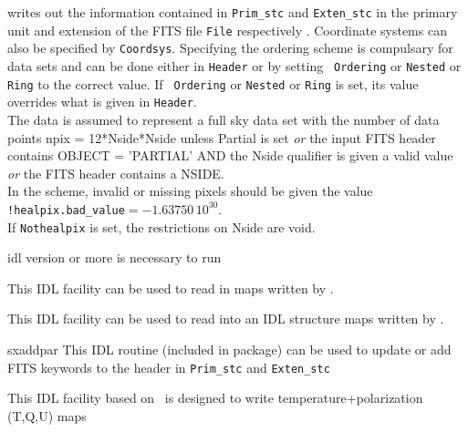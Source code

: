 \begin{codedescription}
{\parbox[t]{\hsize}{\facname writes out the information contained in {\tt{Prim\_stc}} and {\tt{Exten\_stc}} in the primary unit and extension of the FITS file
{\tt File} respectively . Coordinate systems can also be specified by {\tt Coordsys}. Specifying the
ordering scheme is compulsary for \healpix data sets and can be done either in {\tt Header} or by setting {\tt
Ordering} or {\tt Nested} or {\tt Ring} to the correct value. If {\tt
Ordering} or {\tt Nested} or {\tt Ring} is set, its value overrides what is
given in {\tt Header}. \\

The data is assumed to represent a full sky data set with 
the number of data points npix = 12*Nside*Nside
unless   \hfill\newline
Partial is set {\em or} the input FITS header contains OBJECT =
               'PARTIAL' \hfill\newline
       AND \hfill\newline
         the Nside qualifier is given a valid value {\em or} the FITS header contains
                 a NSIDE.\\

In the \healpix scheme, invalid or missing pixels should be given the value {\tt
!healpix.bad\_value}$= -1.63750\, 10^{30}$.\\

If {\tt Nothealpix} is set, the restrictions on Nside are void.}}
\end{codedescription}



\begin{related}
  \begin{sulist}{} %
  \item[idl] version \idlversion or more is necessary to run \thedocid
  \item[\htmlref{read\_fits\_map}{idl:read_fits_map}] This \healpix IDL facility can be used to read in maps
  written by \thedocid.
  \item[\htmlref{read\_fits\_s}{idl:read_fits_s}] This \healpix IDL facility can be used to read
  into an IDL structure maps written by \thedocid.
  \item[sxaddpar] This IDL routine (included in \healpix package) can be used to update
  or add FITS keywords to the header in {\tt Prim\_stc} and {\tt Exten\_stc}

  \item[\htmlref{write\_tqu}{idl:write_tqu}] This \healpix IDL facility based on \thedocid\ is designed to write
  temperature+polarization (T,Q,U) maps
  \end{sulist}
\end{related}


